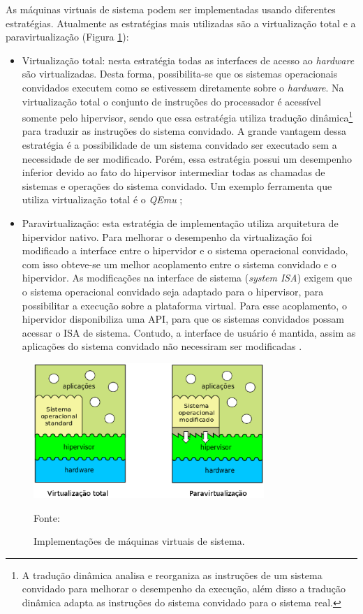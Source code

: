 As máquinas virtuais de sistema podem ser implementadas usando diferentes estratégias. Atualmente as estratégias mais utilizadas
são a virtualização total e a paravirtualização (Figura \ref{fig:vms_implementacao}):
\begin{itemize}
 \item Virtualização total: nesta estratégia todas as interfaces de acesso ao \textit{hardware} são virtualizadas. Desta forma, possibilita-se 
 que os sistemas operacionais convidados executem como se estivessem diretamente sobre o \textit{hardware}. Na virtualização total o conjunto de 
 instruções do processador é acessível somente pelo hipervisor, sendo que essa estratégia utiliza tradução dinâmica\footnote{A tradução dinâmica 
 analisa e reorganiza as instruções de um sistema convidado para melhorar o desempenho da execução, além disso a tradução dinâmica adapta as 
 instruções do sistema convidado para o sistema real.} para traduzir as instruções do sistema convidado. A grande vantagem dessa estratégia é a 
 possibilidade de um sistema convidado ser executado sem a necessidade de ser modificado. Porém, essa estratégia possui um desempenho inferior 
 devido ao fato do hipervisor intermediar todas as chamadas de sistemas e operações do sistema convidado. Um exemplo ferramenta que utiliza 
 virtualização total é o \textit{QEmu} \cite{qemu};
 \item Paravirtualização: esta estratégia de implementação utiliza arquitetura de hipervidor nativo. Para melhorar o desempenho da virtualização
 foi modificado a interface entre o hipervidor e o sistema operacional convidado, com isso obteve-se um melhor acoplamento entre o sistema
 convidado e o hipervidor. As modificações na interface de sistema (\textit{system \ac{ISA}}) exigem que o sistema operacional convidado seja
 adaptado para o hipervisor, para possibilitar a execução sobre a plataforma virtual. Para esse acoplamento, o hipervidor disponibiliza uma
 \ac{API}, para que os sistemas convidados possam acessar o \ac{ISA} de sistema. Contudo, a interface de usuário é mantida, assim as aplicações
 do sistema convidado não necessiram ser modificadas \cite{maziero2013}.
\end{itemize}

\begin{figure}[h!]
 \centering
 \includegraphics[width=330px]{img/vms_implementacao.eps}
 \caption{Implementações de máquinas virtuais de sistema.}
 \label{fig:vms_implementacao}
 Fonte: \citet{maziero2013}
\end{figure}

